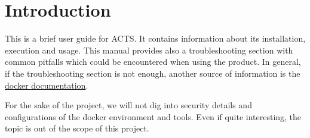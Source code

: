 \section{Introduction}\label{intro}

This is a brief user guide for ACTS.
It contains information about
its installation, execution and usage.
This manual provides also a troubleshooting section with common
pitfalls which could be encountered when using the product.
In general, if the troubleshooting section is not enough,
another source of information is the \href{https://docs.docker.com/engine/userguide/}{docker documentation}.

For the sake of the project, we will not dig into security details and
configurations of the docker environment and tools.
Even if quite interesting, the topic is out of the scope of this project.
